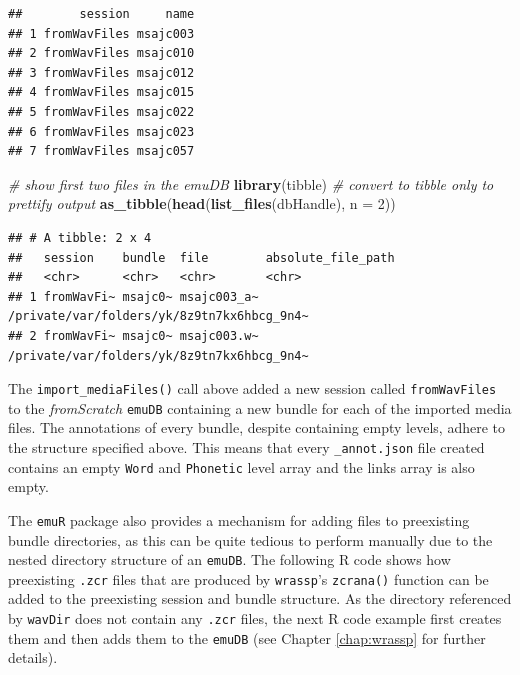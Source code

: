 \documentclass[]{book}
\newenvironment{Shaded}{\begin{snugshade}}{\end{snugshade}}
\newcommand{\CommentTok}[1]{\textcolor[rgb]{0.56,0.35,0.01}{\textit{#1}}}
\newcommand{\DataTypeTok}[1]{\textcolor[rgb]{0.13,0.29,0.53}{#1}}
\newcommand{\DecValTok}[1]{\textcolor[rgb]{0.00,0.00,0.81}{#1}}
\newcommand{\KeywordTok}[1]{\textcolor[rgb]{0.13,0.29,0.53}{\textbf{#1}}}
\newcommand{\NormalTok}[1]{#1}
\begin{document}
\begin{verbatim}
##        session     name
## 1 fromWavFiles msajc003
## 2 fromWavFiles msajc010
## 3 fromWavFiles msajc012
## 4 fromWavFiles msajc015
## 5 fromWavFiles msajc022
## 6 fromWavFiles msajc023
## 7 fromWavFiles msajc057
\end{verbatim}

\begin{Shaded}
\begin{Highlighting}[]
\CommentTok{# show first two files in the emuDB}
\KeywordTok{library}\NormalTok{(tibble) }\CommentTok{# convert to tibble only to prettify output}
\KeywordTok{as_tibble}\NormalTok{(}\KeywordTok{head}\NormalTok{(}\KeywordTok{list_files}\NormalTok{(dbHandle), }\DataTypeTok{n =} \DecValTok{2}\NormalTok{))}
\end{Highlighting}
\end{Shaded}

\begin{verbatim}
## # A tibble: 2 x 4
##   session    bundle  file        absolute_file_path                        
##   <chr>      <chr>   <chr>       <chr>                                     
## 1 fromWavFi~ msajc0~ msajc003_a~ /private/var/folders/yk/8z9tn7kx6hbcg_9n4~
## 2 fromWavFi~ msajc0~ msajc003.w~ /private/var/folders/yk/8z9tn7kx6hbcg_9n4~
\end{verbatim}

The \texttt{import\_mediaFiles()} call above added a new session called \texttt{fromWavFiles} to the \emph{fromScratch} \texttt{emuDB} containing a new bundle for each of the imported media files. The annotations of every bundle, despite containing empty levels, adhere to the structure specified above. This means that every \texttt{\_annot.json} file created contains an empty \texttt{Word} and \texttt{Phonetic} level array and the links array is also empty.

The \texttt{emuR} package also provides a mechanism for adding files to preexisting bundle directories, as this can be quite tedious to perform manually due to the nested directory structure of an \texttt{emuDB}. The following R code shows how preexisting \texttt{.zcr} files that are produced by \texttt{wrassp}'s \texttt{zcrana()} function can be added to the preexisting session and bundle structure. As the directory referenced by \texttt{wavDir} does not contain any \texttt{.zcr} files, the next R code example first creates them and then adds them to the \texttt{emuDB} (see Chapter \ref{chap:wrassp} for further details).
\end{document}
